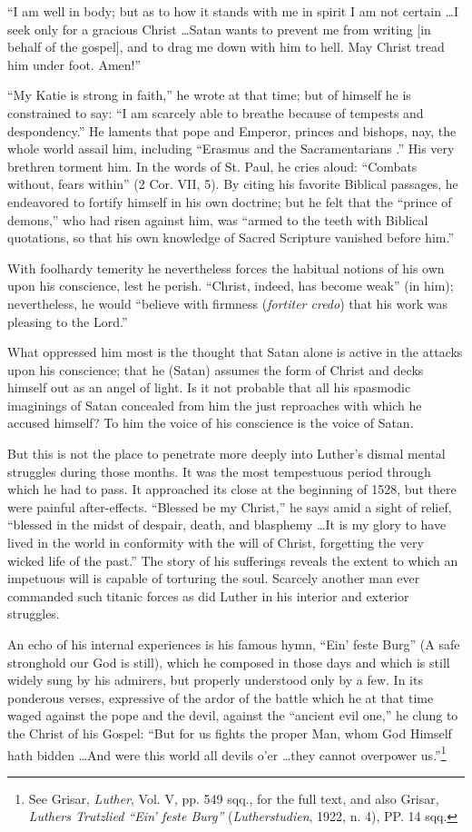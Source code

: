 “I am well in body; but as to how it stands with me in spirit I am not
certain \dots I seek only for a gracious Christ \dots Satan wants to prevent
me from writing [in behalf of the gospel], and to drag me down with him
to hell. May Christ tread him under foot. Amen!”

“My Katie is strong in faith,” he wrote at that time; but of himself he is
constrained to say: “I am scarcely able to breathe because of tempests and
despondency.” He laments that pope and Emperor, princes and bishops,
nay, the whole world assail him, including “Erasmus and the Sacramentarians
.” His very brethren torment him. In the words of St. Paul, he cries
aloud: “Combats without, fears within” (2 Cor. VII, 5). By citing his
favorite Biblical passages, he endeavored to fortify himself in his own doctrine;
but he felt that the “prince of demons,” who had risen against him,
was “armed to the teeth with Biblical quotations, so that his own knowledge
of Sacred Scripture vanished before him.”

With foolhardy temerity he nevertheless forces the habitual notions of
his own upon his conscience, lest he perish. “Christ, indeed, has become
weak” (in him); nevertheless, he would “believe with firmness (\textit{fortiter
credo}) that his work was pleasing to the Lord.”

What oppressed him most is the thought that Satan alone is
active in the attacks upon his conscience; that he (Satan) assumes
the form of Christ and decks himself out as an angel of light. Is it
not probable that all his spasmodic imaginings of Satan concealed
from him the just reproaches with which he accused himself? To
him the voice of his conscience is the voice of Satan.

But this is not the place to penetrate more deeply into Luther’s
dismal mental struggles during those months. It was the most tempestuous
period through which he had to pass. It approached its close
at the beginning of 1528, but there were painful after-effects.
“Blessed be my Christ,” he says amid a sight of relief, “blessed in the
midst of despair, death, and blasphemy \dots It is my glory to have
lived in the world in conformity with the will of Christ, forgetting
the very wicked life of the past.” The story of his sufferings reveals
the extent to which an impetuous will is capable of torturing the
soul. Scarcely another man ever commanded such titanic forces as
did Luther in his interior and exterior struggles.

An echo of his internal experiences is his famous hymn, “Ein’
feste Burg” (A safe stronghold our God is still), which he composed
in those days and which is still widely sung by his admirers, but
properly understood only by a few. In its ponderous verses, expressive
of the ardor of the battle which he at that time waged against the
pope and the devil, against the “ancient evil one,” he clung to the
Christ of his Gospel: “But for us fights the proper Man, whom God
Himself hath bidden \dots And were this world all devils o'er \dots they
cannot overpower us.”\footnote{See Grisar, \textit{Luther}, Vol. V, pp. 549 sqq., for the full text, and also Grisar, \textit{Luthers
Trutzlied “Ein’ feste Burg”} (\textit{Lutherstudien}, 1922, n. 4), PP. 14 sqq.}


